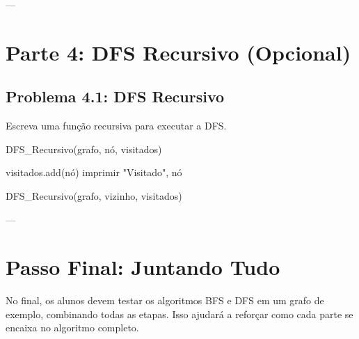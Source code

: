 \documentclass{article}
\begin{document}
---

\section*{Parte 4: DFS Recursivo (Opcional)}

\subsection*{Problema 4.1: DFS Recursivo}

Escreva uma função recursiva para executar a DFS.

\begin{algorithm}[H]
\caption{DFS\_Recursivo(grafo, nó, visitados)}
\begin{algorithmic}
    \STATE visitados.add(nó)
    \STATE imprimir "Visitado", nó

            \STATE DFS\_Recursivo(grafo, vizinho, visitados)
        \ENDIF
    \ENDFOR
\end{algorithmic}
\end{algorithm}

---

\section*{Passo Final: Juntando Tudo}

No final, os alunos devem testar os algoritmos BFS e DFS em um grafo de exemplo, combinando todas as etapas. Isso ajudará a reforçar como cada parte se encaixa no algoritmo completo.
\end{document}
